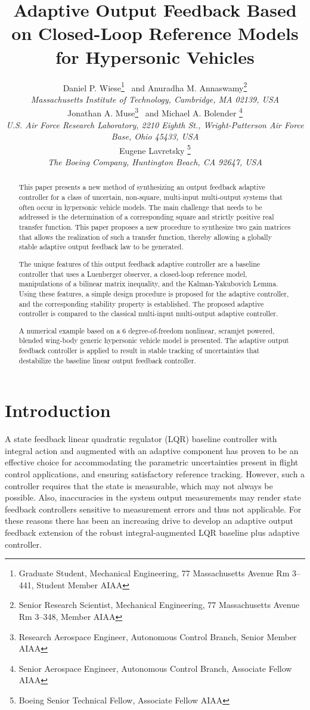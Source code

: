 \documentclass[]{../sty/aiaa-tc}
\title{Adaptive Output Feedback Based on Closed-Loop Reference Models for Hypersonic Vehicles}
\author{%
Daniel P. Wiese\thanks{Graduate Student, Mechanical Engineering, 77 Massachusetts Avenue Rm 3--441, Student Member AIAA}
\ and
Anuradha M. Annaswamy\thanks{Senior Research Scientist, Mechanical Engineering, 77 Massachusetts Avenue Rm 3--348, Member AIAA} \\
{\normalsize\itshape{}Massachusetts Institute of Technology, Cambridge, MA 02139, USA} \\[4pt]
Jonathan A. Muse\thanks{Research Aerospace Engineer, Autonomous Control Branch, Senior Member AIAA}
\ and
Michael A. Bolender \thanks{Senior Aerospace Engineer, Autonomous Control Branch, Associate Fellow AIAA} \\
{\normalsize\itshape{}U.S. Air Force Research Laboratory, 2210 Eighth St., Wright-Patterson Air Force Base, Ohio 45433, USA} \\
Eugene Lavretsky \thanks{Boeing Senior Technical Fellow, Associate Fellow AIAA} \\
{\normalsize\itshape{}The Boeing Company, Huntington Beach, CA 92647, USA}
}
\begin{document}
  \maketitle

  \begin{abstract}
    This paper presents a new method of synthesizing an output feedback adaptive controller for a class of uncertain, non-square, multi-input multi-output systems that often occur in hypersonic vehicle models.
    The main challenge that needs to be addressed is the determination of a corresponding square and strictly positive real transfer function.
    This paper proposes a new procedure to synthesize two gain matrices that allows the realization of such a transfer function, thereby allowing a globally stable adaptive output feedback law to be generated.

    The unique features of this output feedback adaptive controller are a baseline controller that uses a Luenberger observer, a closed-loop reference model, manipulations of a bilinear matrix inequality, and the Kalman-Yakubovich Lemma.
    Using these features, a simple design procedure is proposed for the adaptive controller, and the corresponding stability property is established.
    The proposed adaptive controller is compared to the classical multi-input multi-output adaptive controller.

    A numerical example based on a 6 degree-of-freedom nonlinear, scramjet powered, blended wing-body generic hypersonic vehicle model is presented.
    The adaptive output feedback controller is applied to result in stable tracking of uncertainties that destabilize the baseline linear output feedback controller.
  \end{abstract}

  \section{Introduction}\label{sec.intro}

  A state feedback linear quadratic regulator (LQR) baseline controller with integral action and augmented with an adaptive component has proven to be an effective choice for accommodating the parametric uncertainties present in flight control applications, and ensuring satisfactory reference tracking\cite{jang.adaptive.2007,gibson.adaptivehsv.2008,matsutani.adaptivegtm.2009,crespo.adaptivegtm.2009,dydek.adaptivex15.2010,wiese.adaptive.2013,lavretskywise.book.2013}.
  However, such a controller requires that the state is measurable, which may not always be possible.
  Also, inaccuracies in the system output measurements may render state feedback controllers sensitive to measurement errors and thus not applicable.
  For these reasons there has been an increasing drive to develop an adaptive output feedback extension of the robust integral-augmented LQR baseline plus adaptive controller.
\end{document}
